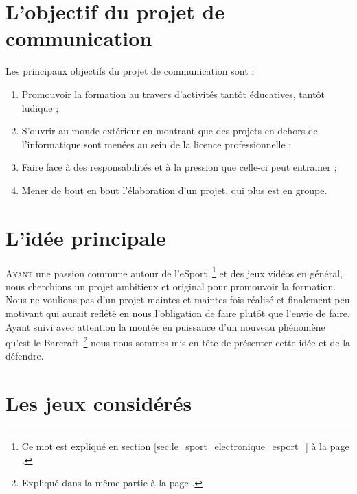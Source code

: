 \section{L'objectif du projet de communication}%
\label{sec:l_objectif_du_projet_de_communication}

Les principaux objectifs du projet de communication sont :

\begin{enumerate}

\item Promouvoir la formation au travers d'activités tantôt éducatives,
tantôt ludique ;

\item S'ouvrir au monde extérieur en montrant que des projets en dehors
de l'informatique sont menées au sein de la licence professionnelle ;

\item Faire face à des responsabilités et à la pression que celle-ci
peut entrainer ;

\item Mener de bout en bout l'élaboration d'un projet, qui plus est en
groupe.

\end{enumerate}

\section{L'idée principale}
\label{sec:l_idee_principale}

\lettrine{A}{yant} une passion commune autour de l'eSport\, \footnote{Ce
mot est expliqué en section \ref{sec:le_sport_electronique_esport_} à la
page \pageref{sec:le_sport_electronique_esport_}.} et des jeux vidéos en
général, nous cherchions un projet ambitieux et original pour promouvoir
la formation. Nous ne voulions pas d'un projet maintes et maintes fois
réalisé et finalement peu motivant qui aurait reflété en nous
l'obligation de faire plutôt que l'envie de faire. Ayant suivi avec
attention la montée en puissance d'un nouveau phénomène qu'est le
Barcraft\, \footnote{Expliqué dans la même partie à la page
\pageref{sec:barcraft}.} nous nous sommes mis en tête de présenter cette
idée et de la défendre.

\section{Les jeux considérés}%
\label{sec:les_jeux_consideres}

